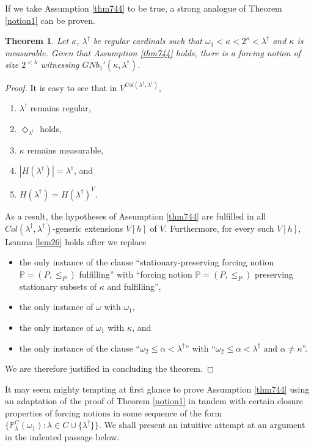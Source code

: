 \documentclass[12pt, twoside]{memoir}
\numberwithin{equation}{section}
\newtheorem{thm}{Theorem}[section]
\theoremstyle{definition}
\theoremstyle{remark}
\theoremstyle{definition}
\theoremstyle{definition}
\theoremstyle{definition}
\theoremstyle{remark}
\begin{document}
If we take Assumption \ref{thm744} to be true, a strong analogue of Theorem \ref{notion1} can be proven.

\begin{thm}
Let $\kappa$, $\lambda^{\dagger}$ be regular cardinals such that $\omega_1 < \kappa < 2^{\kappa} < \lambda^{\dagger}$ and $\kappa$ is measurable. Given that Assumption \ref{thm744} holds, there is a forcing notion of size $2^{< \lambda}$ witnessing $GNb_1'(\kappa, \lambda^{\dagger})$.
\end{thm}

\begin{proof}
It is easy to see that in $V^{Col(\lambda^{\dagger}, \lambda^{\dagger})}$, 
\begin{enumerate}[label=(\arabic*)]
    \item $\lambda^{\dagger}$ remains regular,
    \item $\Diamond_{\lambda^{\dagger}}$ holds,
    \item $\kappa$ remains measurable, 
    \item $|H(\lambda^{\dagger})| = \lambda^{\dagger}$, and
    \item $H(\lambda^{\dagger}) = H(\lambda^{\dagger})^V$.
\end{enumerate}
As a result, the hypotheses of Assumption \ref{thm744} are fulfilled in all $Col(\lambda^{\dagger}, \lambda^{\dagger})$-generic extensions $V[h]$ of $V$. Furthermore, for every such $V[h]$, Lemma \ref{lem26} holds after we replace
\begin{itemize}
    \item the only instance of the clause ``stationary-preserving forcing notion $\mathbb{P} = (P, \leq_P)$ fulfilling'' with ``forcing notion $\mathbb{P} = (P, \leq_P)$ preserving stationary subsets of $\kappa$ and fulfilling'',
    \item the only instance of $\omega$ with $\omega_1$,
    \item the only instance of $\omega_1$ with $\kappa$, and
    \item the only instance of the clause ``$\omega_2 \leq \alpha < \lambda^{\dagger}$'' with ``$\omega_2 \leq \alpha < \lambda^{\dagger} \text{ and } \alpha \neq \kappa$''.
\end{itemize}
We are therefore justified in concluding the theorem.
\end{proof}

It may seem mighty tempting at first glance to prove Assumption \ref{thm744} using an adaptation of the proof of Theorem \ref{notion1} in tandem with certain closure properties of forcing notions in some sequence of the form $\{\mathbb{P}^C_{\lambda}(\omega_1) : \lambda \in C \cup \{\lambda^{\dagger}\}\}$. We shall present an intuitive attempt at an argument in the indented passage below.
\end{document}
